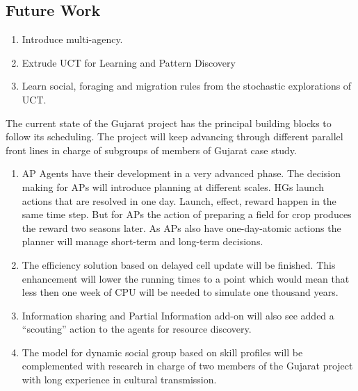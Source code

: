 \documentclass[11pt,oneside,a4paper,openright]{report}
\begin{document}
\subsection{Future Work}

\begin{enumerate}

	\item Introduce multi-agency.
	
	\item Extrude UCT for Learning and Pattern Discovery	
	
	\item Learn social, foraging and migration rules from the stochastic explorations of UCT.
	
\end{enumerate}



The current state of the Gujarat project has the principal building blocks to follow its scheduling. 
The project will keep advancing through different parallel front lines in charge of subgroups of members of Gujarat case study. 
\begin{enumerate}

\item AP Agents have their development in a very advanced phase. The decision making for APs will introduce
planning at different scales. HGs launch actions that are resolved in one day. Launch, effect, reward
happen in the same time step. But for APs the action of preparing a field for crop produces the reward
two seasons later. As APs also have one-day-atomic actions the planner will manage short-term and long-term 
decisions.

\item The efficiency solution based on delayed cell update will be finished. This enhancement will lower the
running times to a point which would mean that less then one week of CPU will be needed to simulate one
thousand years.

\item Information sharing and Partial Information add-on will also see added a ``scouting'' action to the 
agents for resource discovery.

\item The model for dynamic social group based on skill profiles will be complemented with research in
charge of two members of the Gujarat project with long experience in cultural transmission.


\end{enumerate}
\end{document}

